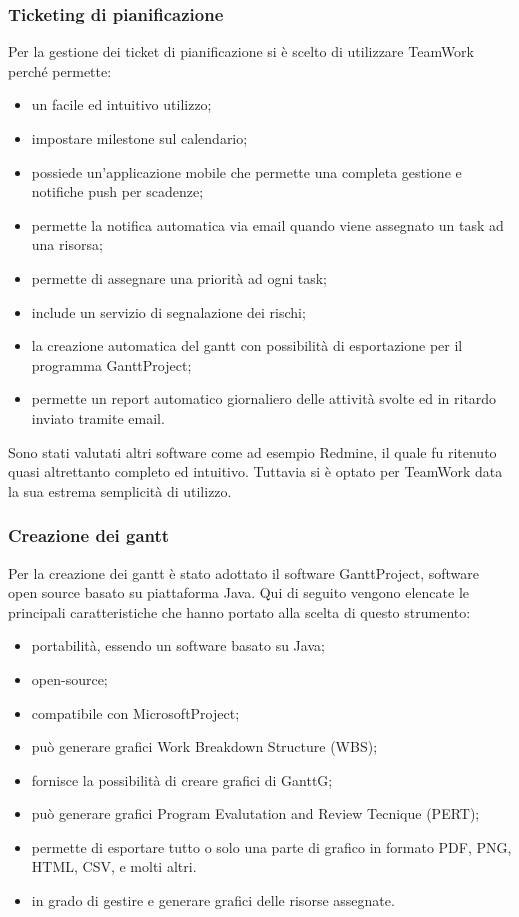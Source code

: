 				\subsubsection{Ticketing di pianificazione}
					Per la gestione dei ticket di pianificazione si è scelto di utilizzare TeamWork perché permette:
					\begin{itemize}
						\item un facile ed intuitivo utilizzo;
						\item impostare milestone sul calendario;
						\item possiede un'applicazione mobile che permette una completa gestione e notifiche push per scadenze;
						\item permette la notifica automatica via email quando viene assegnato un task ad una risorsa;
						\item permette di assegnare una priorità ad ogni task;
						\item include un servizio di segnalazione dei rischi;
						\item la creazione automatica del gantt con possibilità di esportazione per il programma GanttProject;
						\item permette un report automatico giornaliero delle attività svolte ed in ritardo inviato tramite email.
					\end{itemize}
					Sono stati valutati altri software come ad esempio Redmine, il quale fu ritenuto quasi altrettanto completo ed intuitivo. Tuttavia si è optato per TeamWork data la sua estrema semplicità di utilizzo.\\
				\subsubsection{Creazione dei gantt}
			Per la creazione dei gantt è stato adottato il software GanttProject, software open source basato su piattaforma Java. Qui di seguito vengono elencate le principali caratteristiche che hanno portato alla scelta di questo strumento:
			\begin{itemize}
				\item portabilità, essendo un software basato su Java;
				\item open-source;
				\item compatibile con MicrosoftProject;
				\item può generare grafici Work Breakdown Structure (WBS);
				\item fornisce la possibilità di creare grafici di GanttG;
				\item può generare grafici Program Evalutation and Review Tecnique (PERT);
				\item permette di esportare tutto o solo una parte di grafico in formato PDF, PNG, HTML, CSV, e molti altri.
				\item in grado di gestire e generare grafici delle risorse assegnate.
			\end{itemize}
